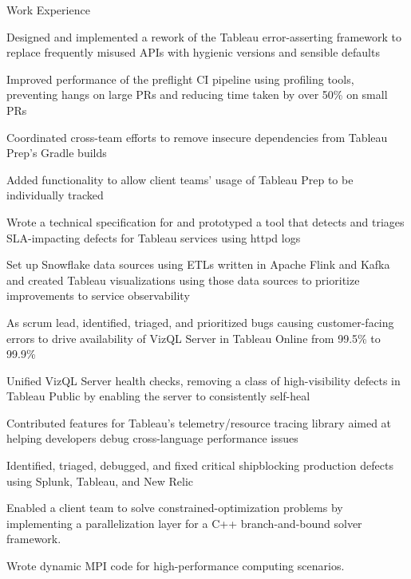 \documentclass{cv}
\begin{document}

\begin{cvsection}{Work Experience}
  {
    \item Designed and implemented a rework of the Tableau error-asserting framework to replace frequently misused APIs with hygienic versions and sensible defaults
    \item Improved performance of the preflight CI pipeline using profiling tools, preventing hangs on large PRs and reducing time taken by over 50\% on small PRs
    \item Coordinated cross-team efforts to remove insecure dependencies from Tableau Prep's Gradle builds
    \item Added functionality to allow client teams' usage of Tableau Prep to be individually tracked
    \item Wrote a technical specification for and prototyped a tool that detects and triages SLA-impacting defects for Tableau services using httpd logs
    \item Set up Snowflake data sources using ETLs written in Apache Flink and Kafka and created Tableau visualizations using those data sources to prioritize improvements to service observability
    \item As scrum lead, identified, triaged, and prioritized bugs causing customer-facing errors to drive availability of VizQL Server in Tableau Online from 99.5\% to 99.9\%
    \item Unified VizQL Server health checks, removing a class of high-visibility defects in Tableau Public by enabling the server to consistently self-heal
    \item Contributed features for Tableau's telemetry/resource tracing library aimed at helping developers debug cross-language performance issues
    \item Identified, triaged, debugged, and fixed critical shipblocking production defects using Splunk, Tableau, and New Relic
  }
  {
    \item Enabled a client team to solve constrained-optimization problems by implementing a parallelization layer for a C++ branch-and-bound solver framework.
    \item Wrote dynamic MPI code for high-performance computing scenarios.
  }
\end{cvsection}
\end{document}
